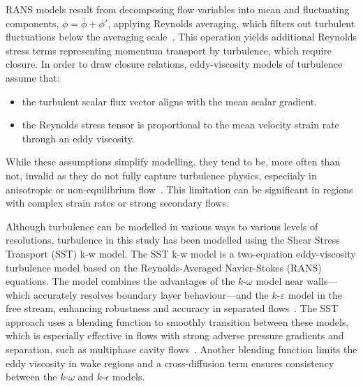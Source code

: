 RANS models result from decomposing flow variables into
 mean and fluctuating components, $\displaystyle \phi = \overline{\phi} + \phi'$, applying Reynolds averaging,
 which filters out turbulent fluctuations below the
 averaging scale~\cite{besnardTurbulenceMultiphaseFlow1988a, hirschNumericalComputationInternal2007}.
 This operation yields additional Reynolds stress terms representing
 momentum transport by turbulence, which require closure.
 In order to draw closure relations, eddy-viscosity models of turbulence assume that:
 \begin{itemize}
    \item the turbulent scalar flux vector aligns with the mean scalar gradient.
    \item the Reynolds stress tensor is proportional to the mean velocity strain rate through an eddy viscosity.
 \end{itemize}
 While these assumptions simplify modelling, they tend to be, more often than not, invalid
 as they do not fully capture turbulence physics, especiialy in anisotropic 
 or non-equilibrium flow~\cite{popeTurbulentFlows2015}. This limitation can be significant
 in regions with complex strain rates or strong secondary flows.

Although turbulence can be modelled in various ways to various levels of resolutions,
 turbulence in this study has been modelled using the Shear Stress Transport (SST) k-w model.
 The SST k-w model is a two-equation eddy-viscosity turbulence model
 based on the Reynolds-Averaged Navier-Stokes (RANS) equations.
 The model combines the advantages of the $k$-$\omega$ model near walls—which
 accurately resolves boundary layer behaviour—and the $k$-$\varepsilon$ model in
 the free stream, enhancing robustness and accuracy in separated flows~\cite{wilcoxTurbulenceModelingCFD2006}.
 The SST approach uses a blending function to smoothly transition between these models,
 which is especially effective in flows with strong adverse pressure gradients and separation,
 such as multiphase cavity flows~\cite{Menter1994}. Another blending function limits the eddy viscosity 
 in wake regions and a cross-diffusion term ensures consistency between the $k$-$\omega$ and $k$-$\epsilon$
 models.


